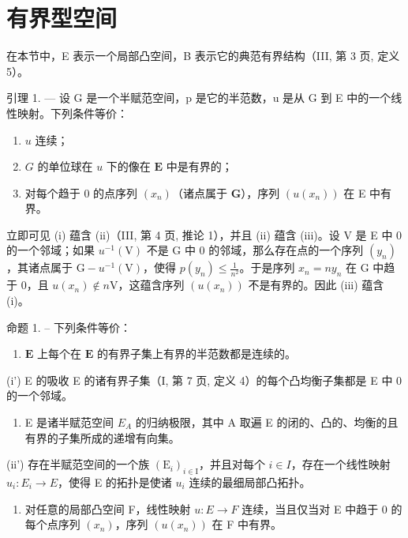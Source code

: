 \section{有界型空间}

在本节中，E 表示一个局部凸空间，B 表示它的典范有界结构（III, 第 3 页, 定义 5）。

引理 1. --- 设 G 是一个半赋范空间，p 是它的半范数，u 是从 G 到 E 中的一个线性映射。下列条件等价：

\begin{enumerate}
\def\labelenumi{(\roman{enumi})}
\item
  \(u\) 连续；
\item
  \(G\) 的单位球在 \(u\) 下的像在 \(\mathbf{E}\) 中是有界的；
\item
  对每个趋于 0 的点序列 \((x_{n})\)（诸点属于 \(\mathbf{G}\)），序列 \((u(x_{n}))\) 在 E 中有界。
\end{enumerate}

立即可见 (i) 蕴含 (ii)（III, 第 4 页, 推论 1），并且 (ii) 蕴含 (iii)。设 V 是 E 中 0 的一个邻域；如果 \(u^{-1}(\mathrm{V})\) 不是 G 中 0 的邻域，那么存在点的一个序列 \((y_n)\)，其诸点属于 \(\mathrm{G} - u^{-1}(\mathrm{V})\)，使得 \(p(y_n) \leqslant \frac{1}{n^2}\)。于是序列 \(x_n = ny_n\) 在 G 中趋于 0，且 \(u(x_n) \notin n\mathrm{V}\)，这蕴含序列 \((u(x_n))\) 不是有界的。因此 (iii) 蕴含 (i)。

命题 1. -- 下列条件等价：

\begin{enumerate}
\def\labelenumi{(\roman{enumi})}
\tightlist
\item
  \(\mathbf{E}\) 上每个在 \(\mathbf{E}\) 的有界子集上有界的半范数都是连续的。
\end{enumerate}

(i') E 的吸收 E 的诸有界子集（I, 第 7 页, 定义 4）的每个凸均衡子集都是 E 中 0 的一个邻域。

\begin{enumerate}
\def\labelenumi{(\roman{enumi})}
\setcounter{enumi}{1}
\tightlist
\item
  E 是诸半赋范空间 \(E_{A}\) 的归纳极限，其中 A 取遍 E 的闭的、凸的、均衡的且有界的子集所成的递增有向集。
\end{enumerate}

(ii') 存在半赋范空间的一个族 \((\mathrm{E}_{i})_{i\in\mathrm{I}}\)，并且对每个 \(i\in I\)，存在一个线性映射 \(u_{i}:E_{i}\to E\)，使得 E 的拓扑是使诸 \(u_{i}\) 连续的最细局部凸拓扑。

\begin{enumerate}
\def\labelenumi{(\roman{enumi})}
\setcounter{enumi}{2}
\tightlist
\item
  对任意的局部凸空间 F，线性映射 \(u: E \to F\) 连续，当且仅当对 E 中趋于 0 的每个点序列 \((x_{n})\)，序列 \((u(x_{n}))\) 在 F 中有界。
\end{enumerate}

